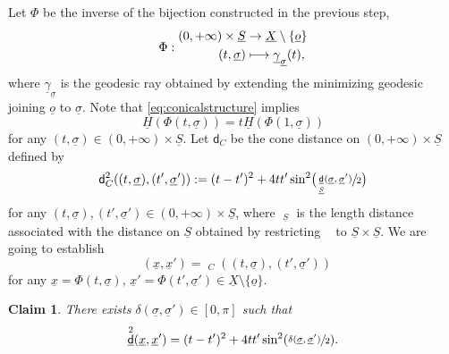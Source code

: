 \documentclass[JEP,XML,SOM,Unicode,published]{cedram}
\newcommand\mto{\mathchoice{\longmapsto}{\mapsto}{\mapsto}{\mapsto}}
\let\backslash\setminus
\theoremstyle{plain}
\newtheorem{claim}[theorem]{Claim}
\theoremstyle{definition}
\newcommand{\dist}{\mathsf{d}}
\newcommand{\uX}{\underline{X}}
\newcommand{\usigma}{\underline{\sigma}}
\DeclareMathOperator{\udist}{\underline{\dist}}
\newcommand{\uo}{\underline{o}}
\newcommand{\ux}{\underline{x}}
\newcommand{\uH}{\underline{H}}
\newcommand{\uS}{\underline{S}}
\newcommand{\ugamma}{\underline{\gamma}}
\begin{document}
Let $\Phi$ be the inverse of the bijection constructed in the previous step, \ie
\[
\Phi: \begin{aligned}
(0,+\infty) \times \uS & \to \uX \backslash\{\uo\} \\
(t,\usigma) & \mto \ugamma_{\usigma}(t),
\end{aligned}
\]
where $\ugamma_{\usigma}$ is the geodesic ray obtained by extending the minimizing geodesic joining $\uo$ to $\usigma$. Note that \eqref{eq:conicalstructure} implies
\begin{equation}\label{eq:conicalstructure2}
\uH(\Phi(t,\usigma))= t\uH(\Phi(1,\usigma))
\end{equation}
for any $(t,\usigma)\in (0,+\infty) \times \uS$. Let $\dist_C$ be the cone distance on $(0,+\infty)\times \uS$ defined by
\[
\dist_C^2((t,\usigma),(t',\usigma')):=(t-t')^2 + 4 t t' \sin^2\bigl(\sfrac{\udist_{\uS}(\usigma,\usigma')}{2}\bigr)
\]
for any $(t,\usigma),(t',\usigma') \in (0,+\infty) \times \uS$, where $\udist_{\uS}$ is the length distance associated with the distance on $\uS$ obtained by restricting $\udist$ to $\uS \times \uS$. We are going to establish
\begin{equation}\label{eq:isometry}
\udist(\ux,\ux') = \udist_C((t,\usigma),(t',\usigma'))
\end{equation}
for any $\ux = \Phi(t,\usigma), \, \ux' = \Phi(t',\usigma') \in \uX \backslash \{\uo\}$.

\begin{claim}\label{claim:isometrywithdelta}
There exists $\delta(\usigma,\usigma') \in [0,\pi]$ such that
\begin{equation}\label{eq:coeur2}
\udist^2(\ux,\ux') = (t-t')^2 + 4 tt' \sin^2(\sfrac{\delta(\usigma,\usigma')}{2}).
\end{equation}
\end{claim}
\end{document}
